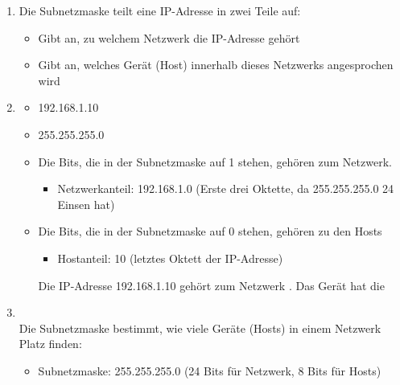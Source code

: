 \begin{infoBox}[title=Subnetzmaske]
    \begin{enumerate}
        \item {}
        Die Subnetzmaske teilt eine IP-Adresse in zwei Teile auf:
        \begin{itemize}
            \item {} Gibt an, zu welchem Netzwerk die IP-Adresse gehört
            \item {} Gibt an, welches Gerät (Host) innerhalb dieses Netzwerks angesprochen wird
        \end{itemize}
        \item {}
        \begin{itemize}
            \item {} 192.168.1.10
            \item {} 255.255.255.0
        \end{itemize}
        \begin{itemize}
            \item {} Die Bits, die in der Subnetzmaske auf 1 stehen, gehören zum Netzwerk.
            \begin{itemize}
                \item Netzwerkanteil: 192.168.1.0 (Erste drei Oktette, da 255.255.255.0 24 Einsen hat)
            \end{itemize}
            \item {} Die Bits, die in der Subnetzmaske auf 0 stehen, gehören zu den Hosts
            \begin{itemize}
                \item Hostanteil: 10 (letztes Oktett der IP-Adresse)
            \end{itemize}
            Die IP-Adresse 192.168.1.10 gehört zum Netzwerk . Das Gerät hat die 
        \end{itemize}
        \item {}\\
        Die Subnetzmaske bestimmt, wie viele Geräte (Hosts) in einem Netzwerk Platz finden:
        \begin{itemize}
            \item Subnetzmaske: 255.255.255.0 (24 Bits für Netzwerk, 8 Bits für Hosts)

\end{itemize}
\end{enumerate}
\end{infoBox}
